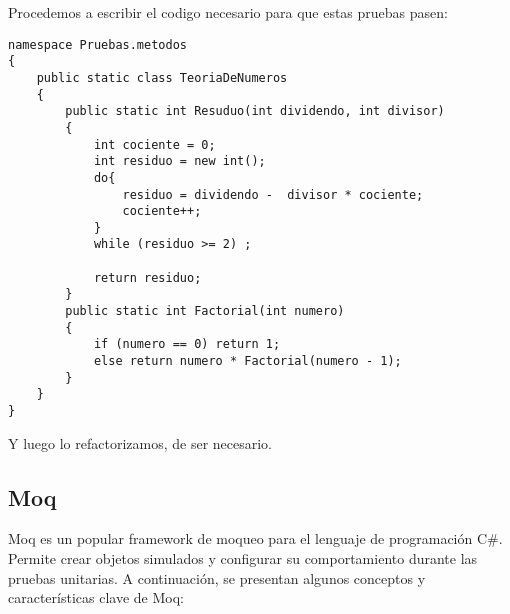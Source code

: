 \documentclass[executivepaper]{article}
\begin{document}
Procedemos a escribir el codigo necesario para que estas pruebas pasen:
\begin{lstlisting}
namespace Pruebas.metodos
{
    public static class TeoriaDeNumeros
    {
        public static int Resuduo(int dividendo, int divisor)
        {
            int cociente = 0;
            int residuo = new int();
            do{ 
                residuo = dividendo -  divisor * cociente;
                cociente++;
            }
            while (residuo >= 2) ;
            
            return residuo;
        }
        public static int Factorial(int numero)
        {
            if (numero == 0) return 1;
            else return numero * Factorial(numero - 1);
        }
    }
}
\end{lstlisting}
Y luego lo refactorizamos, de ser necesario.

\subsection{Moq}
Moq es un popular framework de moqueo para el lenguaje de programación C\#. Permite crear objetos simulados y configurar su comportamiento durante las pruebas unitarias. A continuación, se presentan algunos conceptos y características clave de Moq:
\end{document}
